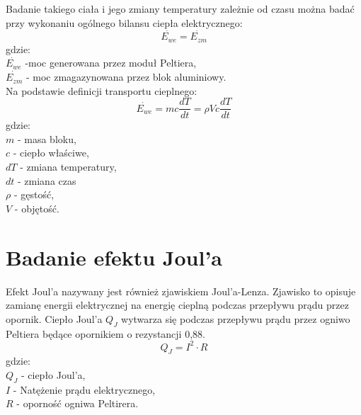 \documentclass[oneside]{mgr}
\begin{document}
Badanie takiego ciała i jego zmiany temperatury zależnie od czasu można badać przy wykonaniu ogólnego bilansu ciepła elektrycznego:
\begin{equation}
    \dot{E_{we}} = \dot{E_{zm}}
\end{equation}
gdzie:\\
$\dot{E_{we}}$ -moc generowana przez moduł Peltiera, \\
$\dot{E_{zm}}$ - moc zmagazynowana przez blok aluminiowy. \\

Na podstawie definicji transportu cieplnego:
\begin{equation}
    \dot{E_{we}} = mc \frac{dT}{dt} = \rho Vc \frac{dT}{dt}
\end{equation}
gdzie:\\
$m$ - masa bloku, \\
$c$ - ciepło właściwe, \\
$dT$ - zmiana temperatury, \\
$dt$ - zmiana czas \\
$\rho$ - gęstość, \\
$V$ - objętość. \\

\section{Badanie efektu Joul'a}
Efekt Joul'a nazywany jest również zjawiskiem Joul'a-Lenza. Zjawisko to opisuje zamianę energii elektrycznej na energię cieplną podczas przepływu prądu przez opornik. Ciepło Joul'a $Q_J$ wytwarza się podczas przepływu prądu przez ogniwo Peltiera będące opornikiem o rezystancji 0,88\ohm.
\begin{equation}
    Q_J = I^2 \cdot R
\end{equation}
gdzie:\\
$Q_J$ - ciepło Joul'a,\\
$I$ - Natężenie prądu elektrycznego,\\
$R$ - oporność ogniwa Peltirera.
\end{document}
